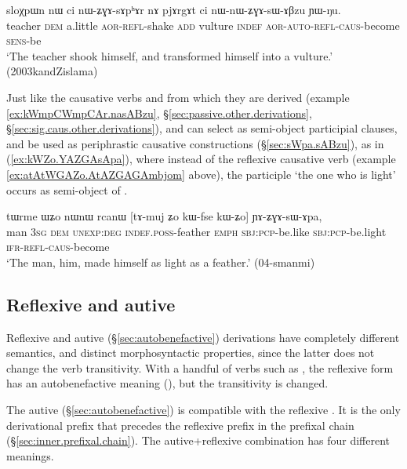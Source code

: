 \begin{exe}
\ex \label{ex:pjArgAt.nWnWZGAsABzu}
\gll sloχpɯn nɯ ci nɯ-ʑɣɤ-sɤpʰɤr nɤ pjɤrgɤt ci nɯ-nɯ-ʑɣɤ-sɯ-ɤβzu ɲɯ-ŋu. \\
teacher \textsc{dem} a.little \textsc{aor}-\textsc{refl}-shake \textsc{add} vulture \textsc{indef} \textsc{aor}-\textsc{auto}-\textsc{refl}-\textsc{caus}-become \textsc{sens}-be \\
 \glt `The teacher shook himself, and transformed himself into a vulture.'  (2003kandZislama)
\end{exe}

Just like the causative verbs   and  from which they are derived (example \ref{ex:kWmpCWmpCAr.nasABzu}, §\ref{sec:passive.other.derivations}, §\ref{sec:sig.caus.other.derivations}),  and  can select as semi-object participial clauses, and be used as periphrastic causative constructions (§\ref{sec:sWpa.sABzu}), as in (\ref{ex:kWZo.YAZGAsApa}), where instead of the reflexive causative verb  (example \ref{ex:atAtWGAZo.AtAZGAGAmbjom} above), the participle  `the one who is light' occurs as semi-object of .

 
\begin{exe}
\ex \label{ex:kWZo.YAZGAsApa}
\gll tɯrme ɯʑo nɯnɯ rcanɯ [tɤ-muj ʑo kɯ-fse kɯ-ʑo] ɲɤ-ʑɣɤ-sɯ-ɤpa, \\
man \textsc{3sg} \textsc{dem} \textsc{unexp}:\textsc{deg} \textsc{indef}.\textsc{poss}-feather \textsc{emph} \textsc{sbj}:\textsc{pcp}-be.like \textsc{sbj}:\textsc{pcp}-be.light \textsc{ifr}-\textsc{refl}-\textsc{caus}-become \\
\glt `The man, him, made himself as light as a feather.' (04-smanmi)
\end{exe}

 \subsection{Reflexive and autive} \label{sec:refl.autoben}
Reflexive and autive (§\ref{sec:autobenefactive}) derivations have completely different semantics, and distinct morphosyntactic properties, since the latter does not change the verb transitivity. With a handful of verbs such as , the reflexive form has an autobenefactive meaning (), but the transitivity is changed. 
 
The autive  (§\ref{sec:autobenefactive}) is compatible with the reflexive . It is the only derivational prefix that precedes the reflexive prefix in the prefixal chain (§\ref{sec:inner.prefixal.chain}). The autive+reflexive combination has four different meanings.

